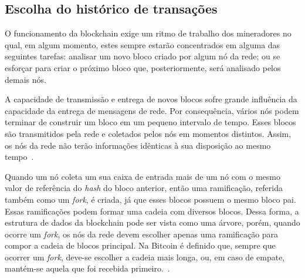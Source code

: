 
\subsection{Escolha do histórico de transações}

O funcionamento da blockchain exige um ritmo de trabalho dos mineradores no qual, em algum momento, estes sempre estarão concentrados em alguma das seguintes tarefas: analisar um novo bloco criado por algum nó da rede; ou se esforçar para criar o próximo bloco que, posteriormente, será analisado pelos demais nós.

A capacidade de transmissão e entrega de novos blocos sofre grande influência da capacidade da entrega de mensagens de rede. Por consequência, vários nós podem terminar de construir um bloco em um pequeno intervalo de tempo. Esses blocos são transmitidos pela rede e coletados pelos nós em momentos distintos. Assim, os nós da rede não terão informações idênticas à sua disposição ao mesmo tempo~\cite{overview-blockchainbasic2018drescher}. 

Quando um nó coleta um sua caixa de entrada mais de um nó com o mesmo valor de referência do \textit{hash} do bloco anterior, então uma ramificação, referida também como um \textit{fork}, é criada, já que esses blocos possuem o mesmo bloco pai. Essas ramificações podem formar uma cadeia com diversos blocos. Dessa forma, a estrutura de dados da blockchain pode ser vista como uma árvore, porém, quando ocorre um \textit{fork}, os nós da rede devem escolher apenas uma ramificação para compor a cadeia de blocos principal. Na Bitcoin é definido que, sempre que ocorrer um \textit{fork}, deve-se escolher a cadeia mais longa, ou, em caso de empate, mantém-se aquela que foi recebida primeiro.~\cite{overview-blockchainbasic2018drescher, sompolinsky2015ghost-original}.

